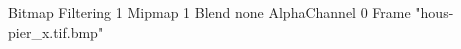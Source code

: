 {Bitmap
	{Filtering 1}
	{Mipmap 1}
	{Blend none}
	{AlphaChannel 0}
	{Frame "hous-pier_x.tif.bmp"}
}
